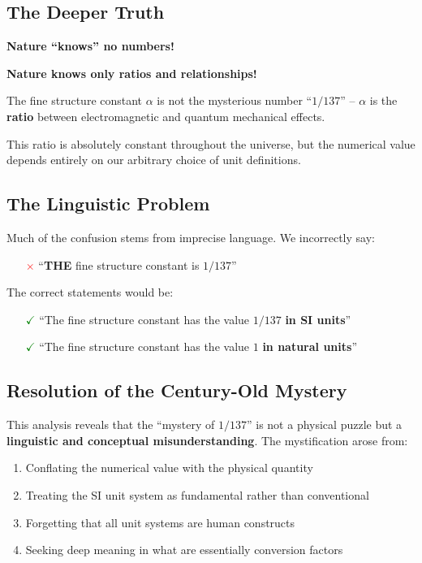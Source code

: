 \documentclass[12pt,a4paper]{article}
\begin{document}
\subsection{The Deeper Truth}

\begin{tcolorbox}[colback=green!5!white,colframe=green!75!black,title=Nature's True Language]
	\textbf{Nature ``knows'' no numbers!}
	
	\textbf{Nature knows only ratios and relationships!}
\end{tcolorbox}

The fine structure constant $\alpha$ is not the mysterious number ``$1/137$'' -- $\alpha$ is the \textbf{ratio} between electromagnetic and quantum mechanical effects.

This ratio is absolutely constant throughout the universe, but the numerical value depends entirely on our arbitrary choice of unit definitions.

\subsection{The Linguistic Problem}

Much of the confusion stems from imprecise language. We incorrectly say:
\begin{itemize}
	\item[\textcolor{red}{$\times$}] ``\textbf{THE} fine structure constant is $1/137$''
\end{itemize}

The correct statements would be:
\begin{itemize}
	\item[\textcolor{green}{$\checkmark$}] ``The fine structure constant has the value $1/137$ \textbf{in SI units}''
	\item[\textcolor{green}{$\checkmark$}] ``The fine structure constant has the value $1$ \textbf{in natural units}''
\end{itemize}

\subsection{Resolution of the Century-Old Mystery}

This analysis reveals that the ``mystery of $1/137$'' is not a physical puzzle but a \textbf{linguistic and conceptual misunderstanding}. The mystification arose from:

\begin{enumerate}
	\item Conflating the numerical value with the physical quantity
	\item Treating the SI unit system as fundamental rather than conventional
	\item Forgetting that all unit systems are human constructs
	\item Seeking deep meaning in what are essentially conversion factors
\end{enumerate}
\end{document}
